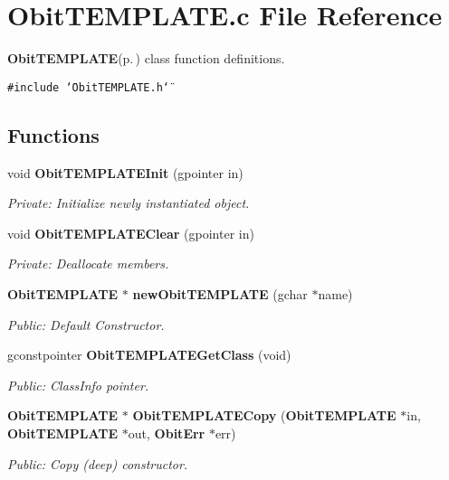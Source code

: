 \section{Obit\-TEMPLATE.c File Reference}
\label{ObitTEMPLATE_8c}
{\bf Obit\-TEMPLATE}{\rm (p.\,\pageref{structObitTEMPLATE})} class function definitions. 

{\tt \#include \char`\"{}Obit\-TEMPLATE.h\char`\"{}}\par
\subsection*{Functions}
\begin{CompactItemize}
\item 
void {\bf Obit\-TEMPLATEInit} (gpointer in)
\begin{CompactList}\small\item\em Private: Initialize newly instantiated object. \item\end{CompactList}\item 
void {\bf Obit\-TEMPLATEClear} (gpointer in)
\begin{CompactList}\small\item\em Private: Deallocate members. \item\end{CompactList}\item 
{\bf Obit\-TEMPLATE} $\ast$ {\bf new\-Obit\-TEMPLATE} (gchar $\ast$name)
\begin{CompactList}\small\item\em Public: Default Constructor. \item\end{CompactList}\item 
gconstpointer {\bf Obit\-TEMPLATEGet\-Class} (void)
\begin{CompactList}\small\item\em Public: Class\-Info pointer. \item\end{CompactList}\item 
{\bf Obit\-TEMPLATE} $\ast$ {\bf Obit\-TEMPLATECopy} ({\bf Obit\-TEMPLATE} $\ast$in, {\bf Obit\-TEMPLATE} $\ast$out, {\bf Obit\-Err} $\ast$err)
\begin{CompactList}\small\item\em Public: Copy (deep) constructor. \item\end{CompactList}\item 

\end{CompactItemize}
